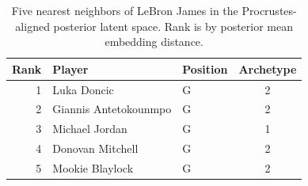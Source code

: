 \begin{table}[htbp]
  \centering\small
  \begin{tabular}{rllc}
    \toprule
    Rank & Player & Position & Archetype \\
    \midrule
    1 & Luka Doncic & G & 2 \\
    2 & Giannis Antetokounmpo & G & 2 \\
    3 & Michael Jordan & G & 1 \\
    4 & Donovan Mitchell & G & 2 \\
    5 & Mookie Blaylock & G & 2 \\
    \bottomrule
  \end{tabular}
  \caption{Five nearest neighbors of LeBron James in the Procrustes-aligned posterior latent space. Rank is by posterior mean embedding distance.}
  \label{tab:LeBron_James_neighbors}
\end{table}

